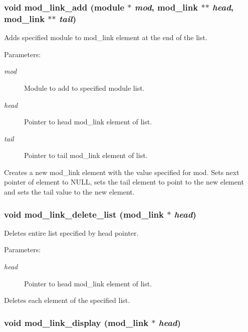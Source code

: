 \subsubsection{\setlength{\rightskip}{0pt plus 5cm}void mod\_\-link\_\-add ({\bf module} $\ast$ {\em mod}, {\bf mod\_\-link} $\ast$$\ast$ {\em head}, {\bf mod\_\-link} $\ast$$\ast$ {\em tail})}\label{link_8h_a3}


Adds specified module to mod\_\-link element at the end of the list.

\begin{Desc}
\item[Parameters: ]\par
\begin{description}
\item[{\em 
mod}]Module to add to specified module list. \item[{\em 
head}]Pointer to head mod\_\-link element of list. \item[{\em 
tail}]Pointer to tail mod\_\-link element of list.\end{description}
\end{Desc}
Creates a new mod\_\-link element with the value specified for mod. Sets next pointer of element to NULL, sets the tail element to point to the new element and sets the tail value to the new element. 
\subsubsection{\setlength{\rightskip}{0pt plus 5cm}void mod\_\-link\_\-delete\_\-list ({\bf mod\_\-link} $\ast$ {\em head})}\label{link_8h_a15}


Deletes entire list specified by head pointer.

\begin{Desc}
\item[Parameters: ]\par
\begin{description}
\item[{\em 
head}]Pointer to head mod\_\-link element of list.\end{description}
\end{Desc}
Deletes each element of the specified list. 
\subsubsection{\setlength{\rightskip}{0pt plus 5cm}void mod\_\-link\_\-display ({\bf mod\_\-link} $\ast$ {\em head})}\label{link_8h_a7}


